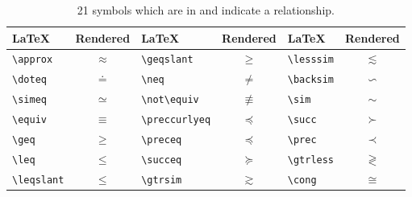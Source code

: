 \begin{table}[ht]
        \centering
            \begin{tabular}{lc|lc|lc}
                \toprule
                \LaTeX & Rendered & \LaTeX & Rendered & \LaTeX & Rendered \\
                \midrule
\verb+\approx+ & $\approx$ &\verb+\geqslant+ & $\geqslant$ &\verb+\lesssim+ & $\lesssim$\\
\verb+\doteq+ & $\doteq$ &\verb+\neq+ & $\neq$ &\verb+\backsim+ & $\backsim$\\
\verb+\simeq+ & $\simeq$ &\verb+\not\equiv+ & $\not\equiv$ &\verb+\sim+ & $\sim$\\
\verb+\equiv+ & $\equiv$ &\verb+\preccurlyeq+ & $\preccurlyeq$ &\verb+\succ+ & $\succ$\\
\verb+\geq+ & $\geq$ &\verb+\preceq+ & $\preceq$ &\verb+\prec+ & $\prec$\\
\verb+\leq+ & $\leq$ &\verb+\succeq+ & $\succeq$ &\verb+\gtrless+ & $\gtrless$\\
\verb+\leqslant+ & $\leqslant$ &\verb+\gtrsim+ & $\gtrsim$ &\verb+\cong+ & $\cong$\\
        \bottomrule
    \end{tabular}

    \caption{21 symbols which are in \dbName and indicate a relationship.}
    \label{table:symbols-of-db-2}
\end{table}


